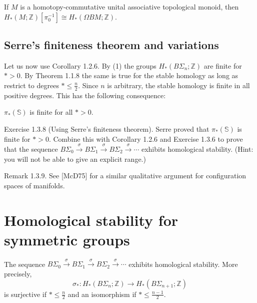 \begin{theo}
     If $M$ is a homotopy-commutative unital associative topological monoid, then $H_*(M ; \mathbb{Z})\left[\pi_0^{-1}\right] \cong H_*(\Omega B M ; \mathbb{Z})$.    
\end{theo}


\section{Serre's finiteness theorem and variations}

Let us now use Corollary 1.2.6. By (1) the groups $H_*\left(B \Sigma_n ; \mathbb{Z}\right)$ are finite for $*>0$. By Theorem 1.1.8 the same is true for the stable homology as long as restrict to degrees $* \leq \frac{n}{2}$. Since $n$ is arbitrary, the stable homology is finite in all positive degrees. This has the following consequence:

\begin{theo}
$\pi_*(\mathbb{S})$ is finite for all $*>0$.
\end{theo}


Exercise 1.3.8 (Using Serre's finiteness theorem). Serre proved that $\pi_*(\mathbb{S})$ is finite for $*>0$. Combine this with Corollary 1.2.6 and Exercise 1.3.6 to prove that the sequence $B \Sigma_0 \xrightarrow{\sigma} B \Sigma_1 \xrightarrow{\sigma} B \Sigma_2 \xrightarrow{\sigma} \cdots$ exhibits homological stability. (Hint: you will not be able to give an explicit range.)

Remark 1.3.9. See [McD75] for a similar qualitative argument for configuration spaces of manifolds.


\chapter{Homological stability for symmetric groups}

\begin{theo}
The sequence $B \Sigma_0 \xrightarrow{\sigma} B \Sigma_1 \xrightarrow{\sigma} B \Sigma_2 \xrightarrow{\sigma} \cdots$ exhibits homological stability. More precisely,
$$
\sigma_*: H_*\left(B \Sigma_n ; \mathbb{Z}\right) \longrightarrow H_*\left(B \Sigma_{n+1} ; \mathbb{Z}\right)
$$
is surjective if $* \leq \frac{n}{2}$ and an isomorphism if $* \leq \frac{n-1}{2}$.
\end{theo}









\printbibliography %
